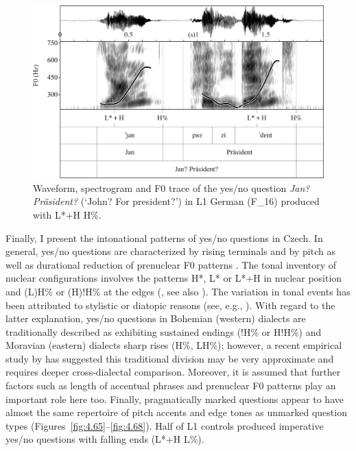 \begin{figure}


\includegraphics[width=\textwidth]{figures/Figure_4.64.png}



\caption{Waveform, spectrogram and F0 trace of the yes/no question \textit{Jan? Präsident?} (‘John? For president?’) in L1 German (F\_16) produced with L*+H H\%.}
\label{fig:4.64}
\end{figure}


Finally, I present the intonational patterns of yes/no questions in Czech. In general, yes/no questions are characterized by rising terminals and by pitch as well as durational reduction of prenuclear F0 patterns \citep{PeškováEtAl2018}. The tonal inventory of nuclear configurations involves the patterns H*, L* or L*+H in nuclear position and (L)H\% or (H)!H\% at the edges (\citealt{PeškováForthcoming}, see also \citealt{Daneš1957, Grepl1965, Janíková2000, Veroňková2006, Palková2017}). The variation in tonal events has been attributed to stylistic or diatopic reasons (see, e.g., \citealt{Daneš1957}). With regard to the latter explanation, yes/no questions in Bohemian (western) dialects are traditionally described as exhibiting sustained endings (!H\% or H!H\%) and Moravian (eastern) dialects sharp rises (H\%, LH\%); however, a recent empirical study by \citet{PeškováEtAl2018} has suggested this traditional division may be very approximate and requires deeper cross-dialectal comparison. Moreover, it is assumed that further factors such as length of accentual phrases and prenuclear F0 patterns play an important role here too. Finally, pragmatically marked questions appear to have almost the same repertoire of pitch accents and edge tones as unmarked question types (Figures~\ref{fig:4.65}--\ref{fig:4.68}). Half of L1 controls produced imperative yes/no questions with falling ends (L*+H L\%).


